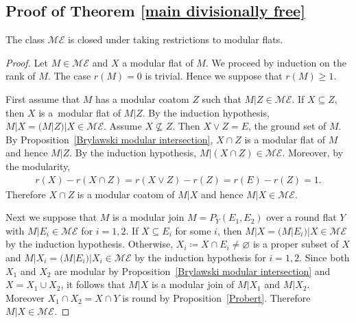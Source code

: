 \subsection{Proof of Theorem \ref{main divisionally free}}
\begin{Lemma}\label{restriction modular flat}
The class $ \mathcal{ME} $ is closed under taking restrictions to modular flats.
\end{Lemma}
\begin{proof}
Let $ M \in \mathcal{ME} $ and $ X $ a modular flat of $ M $.
We proceed by induction on the rank of $ M $.
The case $ r(M)=0 $ is trivial.
Hence we suppose that $ r(M) \geq 1 $.

First assume that $ M $ has a modular coatom $ Z $ such that $ M|Z \in \mathcal{ME} $.
If $ X \subseteq Z $, then $ X $ is a~modular flat of $ M|Z $.
By the induction hypothesis, $ M|X = (M|Z)|X \in \mathcal{ME} $.
Assume $ X \not\subseteq Z $.
Then $ X \vee Z = E $, the ground set of $ M $.
By Proposition~\ref{Brylawski modular intersection}, $ X \cap Z $ is a modular flat of $ M $ and hence $ M|Z $.
By the induction hypothesis, $ M|(X \cap Z) \in \mathcal{ME} $.
Moreover, by the modularity,
\begin{gather*}
r(X) - r(X \cap Z) = r(X \vee Z) - r(Z) = r(E) - r(Z) = 1.
\end{gather*}
Therefore $ X \cap Z $ is a modular coatom of $ M|X $ and hence $ M|X \in \mathcal{ME} $.

Next we suppose that $ M $ is a modular join $ M = P_{Y}(E_{1}, E_{2}) $ over a round flat $ Y $ with $ M|E_{i} \in \mathcal{ME} $ for $ i = 1,2 $.
If $ X \subseteq E_{i} $ for some $ i $, then $ M|X = (M|E_{i})|X \in \mathcal{ME} $ by the induction hypothesis.
Otherwise, $ X_{i} \coloneqq X \cap E_{i} \neq \varnothing $ is a proper subset of $ X $ and $ M|X_{i} = (M|E_{i})|X_{i} \in \mathcal{ME} $ by the induction hypothesis for $ i = 1,2 $.
Since both $ X_{1} $ and $ X_{2} $ are modular by Proposition~\ref{Brylawski modular intersection} and $ X = X_{1} \cup X_{2} $, it follows that $ M|X $ is a modular join of $ M|X_{1} $ and $ M|X_{2} $.
Moreover $ X_{1} \cap X_{2} = X \cap Y $ is round by Proposition~\ref{Probert}.
Therefore $ M|X \in \mathcal{ME} $.
\end{proof}

